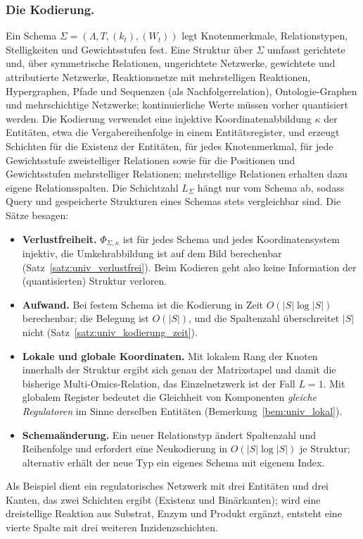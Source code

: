 \documentclass[a4paper,12pt, twoside]{report}
\theoremstyle{definition}
\begin{document}
\subsubsection{Die Kodierung.} Ein Schema $\Sigma=(\Lambda,T,(k_t),(W_t))$ legt Knotenmerkmale, Relationstypen, Stelligkeiten und Gewichtsstufen fest. Eine Struktur über $\Sigma$ umfasst gerichtete und, über symmetrische Relationen, ungerichtete Netzwerke, gewichtete und attributierte Netzwerke, Reaktionsnetze mit mehrstelligen Reaktionen, Hypergraphen, Pfade und Sequenzen (als Nachfolgerrelation), Ontologie-Graphen und mehrschichtige Netzwerke; kontinuierliche Werte müssen vorher quantisiert werden. Die Kodierung verwendet eine injektive Koordinatenabbildung $\kappa$ der Entitäten, etwa die Vergabereihenfolge in einem Entitätsregister, und erzeugt Schichten für die Existenz der Entitäten, für jedes Knotenmerkmal, für jede Gewichtsstufe zweistelliger Relationen sowie für die Positionen und Gewichtsstufen mehrstelliger Relationen; mehrstellige Relationen erhalten dazu eigene Relationsspalten. Die Schichtzahl $L_\Sigma$ hängt nur vom Schema ab, sodass Query und gespeicherte Strukturen eines Schemas stets vergleichbar sind. Die Sätze besagen:
\begin{itemize}
	\item \textbf{Verlustfreiheit.} $\Phi_{\Sigma,\kappa}$ ist für jedes Schema und jedes Koordinatensystem injektiv, die Umkehrabbildung ist auf dem Bild berechenbar (Satz~\ref{satz:univ_verlustfrei}). Beim Kodieren geht also keine Information der (quantisierten) Struktur verloren.
	\item \textbf{Aufwand.} Bei festem Schema ist die Kodierung in Zeit $O(|S|\log|S|)$ berechenbar; die Belegung ist $O(|S|)$, und die Spaltenzahl überschreitet $|S|$ nicht (Satz~\ref{satz:univ_kodierung_zeit}).
	\item \textbf{Lokale und globale Koordinaten.} Mit lokalem Rang der Knoten innerhalb der Struktur ergibt sich genau der Matrixstapel und damit die bisherige Multi-Omics-Relation, das Einzelnetzwerk ist der Fall $L=1$. Mit globalem Register bedeutet die Gleichheit von Komponenten \emph{gleiche Regulatoren} im Sinne derselben Entitäten (Bemerkung~\ref{bem:univ_lokal}).
	\item \textbf{Schemaänderung.} Ein neuer Relationstyp ändert Spaltenzahl und Reihenfolge und erfordert eine Neukodierung in $O(|S|\log|S|)$ je Struktur; alternativ erhält der neue Typ ein eigenes Schema mit eigenem Index.
\end{itemize}
Als Beispiel dient ein regulatorisches Netzwerk mit drei Entitäten und drei Kanten, das zwei Schichten ergibt (Existenz und Binärkanten); wird eine dreistellige Reaktion aus Substrat, Enzym und Produkt ergänzt, entsteht eine vierte Spalte mit drei weiteren Inzidenzschichten.
\end{document}

